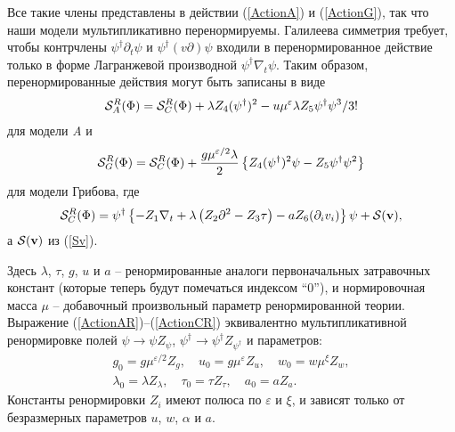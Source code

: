 \documentclass[a4paper,10pt]{article}
\def\S{{\cal S}}
\def\bfv{{\bf v}}
\def\S{{\cal S}}
\def\bfv{{\bf v}}
\begin{document}
Все такие члены представлены в действии (\ref{ActionA}) и (\ref{ActionG}), так что наши модели мультипликативно перенормируемы.
Галилеева симметрия требует, чтобы контрчлены
$\psi^{\dag}\partial_{t}\psi$ и $\psi^{\dag} (v\partial) \psi $ входили в перенормированное действие только в форме Лагранжевой производной
 $\psi^{\dag}\nabla_{t}\psi$.
Таким образом, перенормированные действия могут быть записаны в виде
\begin{eqnarray}
\S_{A}^{R}(\Phi) = \S_{C}^{R}(\Phi) +
\lambda Z_{4}  (\psi^{\dag})^{2} -
u\mu^{\varepsilon} \lambda Z_{5}  \psi^{\dag} \psi^{3} /3!
\label{ActionAR}
\end{eqnarray}
для модели {\it A} и
\begin{eqnarray}
\S_{G}^{R}(\Phi) = \S_{C}^{R}(\Phi)
+ \frac{g\mu^{\varepsilon/2}\lambda}{2} \left\{ Z_{4}(\psi^{\dagger})^2\psi
- Z_{5} \psi^{\dagger}\psi^2  \right\}
\label{ActionGR}
\end{eqnarray}
для модели Грибова, где
\begin{eqnarray}
\S_{C}^{R}(\Phi) =  \psi^{\dag} \left\{
- Z_{1} \nabla_{t} + \lambda\left( Z_{2} \partial^{2}- Z_{3}\tau\right)
- a Z_{6} (\partial_{i}v_{i}) \right\} \psi +  \S(\bfv),
\label{ActionCR}
\end{eqnarray}
а $\S(\bfv)$ из (\ref{Sv}).

Здесь $\lambda$, $\tau$, $g$, $u$ и $a$ -- ренормированные аналоги
первоначальных затравочных констант  (которые теперь будут помечаться
индексом ``0''), и нормировочная масса $\mu $ -- добавочный произвольный
параметр ренормированной теории. Выражение (\ref{ActionAR})--(\ref{ActionCR})
эквивалентно мультипликативной ренормировке полей $\psi \to \psi Z_{\psi}$,
$\psi^{\dag} \to \psi^{\dag} Z_{\psi^{\dag}}$
и параметров:
\begin{eqnarray}
g_{0} = g \mu^{\varepsilon/2} Z_{g}, \quad u_{0} = g \mu^{\varepsilon} Z_{u}, \quad
w_{0} = w \mu^{\xi} Z_{w}, \nonumber \\
\lambda_{0} = \lambda Z_{\lambda}, \quad
\tau_{0} = \tau Z_{\tau},  \quad  a_{0} = a Z_{a}.
\label{Multy}
\end{eqnarray}
 Константы ренормировки $Z_{i}$ имеют полюса по  $\varepsilon$ и $\xi$, и зависят только от безразмерных параметров
 $u$, $w$, $\alpha$ и $a$.
\end{document}
